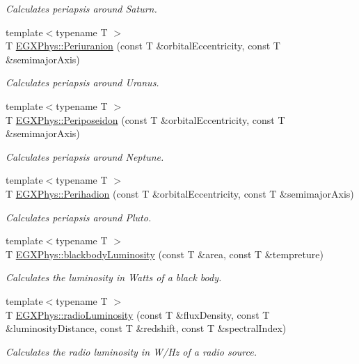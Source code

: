 \begin{DoxyCompactItemize}
\begin{DoxyCompactList}\small\item\em Calculates periapsis around Saturn. \end{DoxyCompactList}\item 
{\footnotesize template$<$typename T $>$ }\\T \hyperlink{group___astrophysics_gab8b8131a617dd2d2a4de1d48accd7442}{E\+G\+X\+Phys\+::\+Periuranion} (const T \&orbital\+Eccentricity, const T \&semimajor\+Axis)
\begin{DoxyCompactList}\small\item\em Calculates periapsis around Uranus. \end{DoxyCompactList}\item 
{\footnotesize template$<$typename T $>$ }\\T \hyperlink{group___astrophysics_ga237e7af3794202c67e65f64f4c8abc2a}{E\+G\+X\+Phys\+::\+Periposeidon} (const T \&orbital\+Eccentricity, const T \&semimajor\+Axis)
\begin{DoxyCompactList}\small\item\em Calculates periapsis around Neptune. \end{DoxyCompactList}\item 
{\footnotesize template$<$typename T $>$ }\\T \hyperlink{group___astrophysics_gafb16e46e55078b38604eef0d7c7c40c4}{E\+G\+X\+Phys\+::\+Perihadion} (const T \&orbital\+Eccentricity, const T \&semimajor\+Axis)
\begin{DoxyCompactList}\small\item\em Calculates periapsis around Pluto. \end{DoxyCompactList}\item 
{\footnotesize template$<$typename T $>$ }\\T \hyperlink{group___astrophysics_ga909f82edfaed449b44e94788b642ebb8}{E\+G\+X\+Phys\+::blackbody\+Luminosity} (const T \&area, const T \&tempreture)
\begin{DoxyCompactList}\small\item\em Calculates the luminosity in Watts of a black body. \end{DoxyCompactList}\item 
{\footnotesize template$<$typename T $>$ }\\T \hyperlink{group___astrophysics_ga6d6865b2aac1bc7c7f06b7c4ac2444e4}{E\+G\+X\+Phys\+::radio\+Luminosity} (const T \&flux\+Density, const T \&luminosity\+Distance, const T \&redshift, const T \&spectral\+Index)
\begin{DoxyCompactList}\small\item\em Calculates the radio luminosity in W/\+Hz of a radio source. \end{DoxyCompactList}\item 

\end{DoxyCompactItemize}
